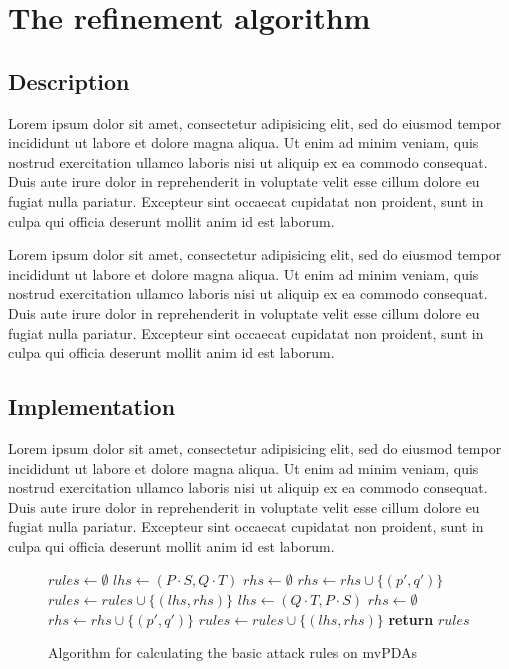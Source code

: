 \chapter{The refinement algorithm}

\section{Description}


Lorem ipsum dolor sit amet, consectetur adipisicing elit, sed do eiusmod tempor incididunt ut labore et dolore magna aliqua. Ut enim ad minim veniam, quis nostrud exercitation ullamco laboris nisi ut aliquip ex ea commodo consequat. Duis aute irure dolor in reprehenderit in voluptate velit esse cillum dolore eu fugiat nulla pariatur. Excepteur sint occaecat cupidatat non proident, sunt in culpa qui officia deserunt mollit anim id est laborum.

Lorem ipsum dolor sit amet, consectetur adipisicing elit, sed do eiusmod tempor incididunt ut labore et dolore magna aliqua. Ut enim ad minim veniam, quis nostrud exercitation ullamco laboris nisi ut aliquip ex ea commodo consequat. Duis aute irure dolor in reprehenderit in voluptate velit esse cillum dolore eu fugiat nulla pariatur. Excepteur sint occaecat cupidatat non proident, sunt in culpa qui officia deserunt mollit anim id est laborum.

\section{Implementation}

Lorem ipsum dolor sit amet, consectetur adipisicing elit, sed do eiusmod tempor incididunt ut labore et dolore magna aliqua. Ut enim ad minim veniam, quis nostrud exercitation ullamco laboris nisi ut aliquip ex ea commodo consequat. Duis aute irure dolor in reprehenderit in voluptate velit esse cillum dolore eu fugiat nulla pariatur. Excepteur sint occaecat cupidatat non proident, sunt in culpa qui officia deserunt mollit anim id est laborum.

\begin{figure}[ht]
\caption{Algorithm for calculating the basic attack rules on mvPDAs}
\begin{algorithmic}[1]
  \State $rules ← ∅$
      \State $lhs ← (P⋅S, Q⋅T)$
        \State $rhs ← ∅$
          \State $rhs ← rhs ∪ \{ (p', q') \}$
        \EndFor
        \State $rules ← rules ∪ \{(lhs, rhs)\}$
      \EndFor
      \State $lhs ← (Q⋅T, P⋅S)$
        \State $rhs ← ∅$
          \State $rhs ← rhs ∪ \{ (p', q') \}$
        \EndFor
        \State $rules ← rules ∪ \{(lhs, rhs)\}$
      \EndFor
  \EndFor
  \State \textbf{return} $rules$
\EndFunction
\end{algorithmic}
\end{figure}

